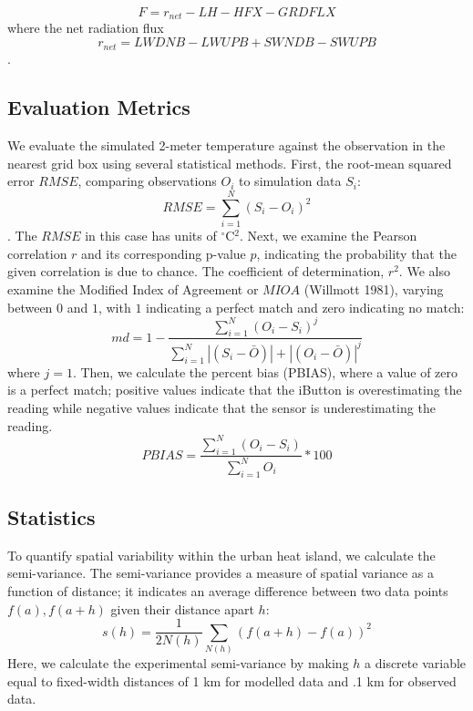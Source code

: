 \documentclass[draft,linenumbers]{agujournal}
\begin{document}
\begin{equation}
F= r_{net} -LH - HFX - GRDFLX
\end{equation}
where the net radiation flux $$r_{net}=LWDNB-LWUPB + SWNDB-SWUPB$$. 
  
\subsection{Evaluation Metrics}

We evaluate the simulated 2-meter temperature against the observation in the nearest grid box using several statistical methods. First, the root-mean squared error $RMSE$, comparing observations $O_i$ to simulation data $S_i$:  
\begin{equation}%
RMSE = \sum_{i=1}^{N} \left(S_i - O_i\right)^2
\end{equation}
. The $RMSE$ in this case has units of $^\circ$C$^2$. Next, we examine the Pearson correlation $r$ and its corresponding p-value $p$, indicating the probability that the given correlation is due to chance. The coefficient of determination, $r^2$. We also examine the Modified Index of Agreement or $MIOA$ (Willmott 1981), varying between \(0\) and \(1\), with \(1\) indicating a perfect match and zero indicating no match: 
\begin{equation}
md = 1 - \frac{\sum_{i=1}^{N}(O_{i}-S_{i})^{j}}{\sum_{i=1}^{N}|(S_{i}-\bar{O})|+|(O_{i}-\bar{O})|^{j}}
\end{equation}
where $j=1$. 
Then, we calculate the percent bias (PBIAS), where a value of zero is a perfect match; positive values indicate that the iButton is overestimating the reading while negative values indicate that the sensor is underestimating the reading.
\begin{equation}
PBIAS = \frac{\sum_{i=1}^{N}(O_{i}-S_{i})}{\sum_{i=1}^{N}O_{i}}*100
\end{equation}

\subsection{Statistics}
To quantify spatial variability within the urban heat island, we calculate the semi-variance. The semi-variance provides a measure of spatial variance as a function of distance; it indicates an average difference between two data points $f(a), f(a+h)$ given their distance apart $h$: 
$$ s(h) = \frac{1}{2 N(h)} \sum _{N(h)} \left(f(a+h) -f(a)\right)^2 $$
Here, we calculate the experimental semi-variance by making $h$ a discrete variable equal to fixed-width distances of 1 km for modelled data and .1 km for observed data. 
\end{document}
